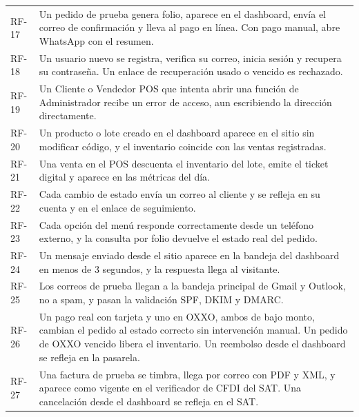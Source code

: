 \documentclass[11pt,letterpaper]{article}
\begin{document}
\begin{longtable}{@{} L{1.9cm} L{13.9cm} @{}}
RF-17 & Un pedido de prueba genera folio, aparece en el dashboard, envía el correo de confirmación y lleva al pago en línea. Con pago manual, abre WhatsApp con el resumen. \\
RF-18 & Un usuario nuevo se registra, verifica su correo, inicia sesión y recupera su contraseña. Un enlace de recuperación usado o vencido es rechazado. \\
RF-19 & Un Cliente o Vendedor POS que intenta abrir una función de Administrador recibe un error de acceso, aun escribiendo la dirección directamente. \\
RF-20 & Un producto o lote creado en el dashboard aparece en el sitio sin modificar código, y el inventario coincide con las ventas registradas. \\
RF-21 & Una venta en el POS descuenta el inventario del lote, emite el ticket digital y aparece en las métricas del día. \\
RF-22 & Cada cambio de estado envía un correo al cliente y se refleja en su cuenta y en el enlace de seguimiento. \\
RF-23 & Cada opción del menú responde correctamente desde un teléfono externo, y la consulta por folio devuelve el estado real del pedido. \\
RF-24 & Un mensaje enviado desde el sitio aparece en la bandeja del dashboard en menos de 3 segundos, y la respuesta llega al visitante. \\
RF-25 & Los correos de prueba llegan a la bandeja principal de Gmail y Outlook, no a spam, y pasan la validación SPF, DKIM y DMARC. \\
RF-26 & Un pago real con tarjeta y uno en OXXO, ambos de bajo monto, cambian el pedido al estado correcto sin intervención manual. Un pedido de OXXO vencido libera el inventario. Un reembolso desde el dashboard se refleja en la pasarela. \\
RF-27 & Una factura de prueba se timbra, llega por correo con PDF y XML, y aparece como vigente en el verificador de CFDI del SAT. Una cancelación desde el dashboard se refleja en el SAT. \\
\end{longtable}
\normalsize
\end{document}
